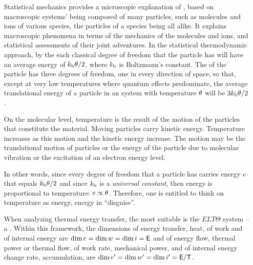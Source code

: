 \begin{note}
Statistical mechanics provides a microscopic explanation of , based on macroscopic systems' being composed of many particles, such as molecules and ions of various species, the particles of a species being all alike. It explains macroscopic phenomena in terms of the mechanics of the molecules and ions, and statistical assessments of their joint adventures. In the statistical thermodynamic approach, by the  each classical degree of freedom that the particle has will have an average energy of $k_\text{b}\theta/2$, where $k_\text{b}$ is Boltzmann's constant. The  of the particle has three degrees of freedom, one in every direction of space, so that, except at very low temperatures where quantum effects predominate, the average translational energy of a particle in an system with temperature $\theta$ will be $3k_\text{b}\theta/2$.

On the molecular level, temperature is the result of the motion of the particles that constitute the material. Moving particles carry kinetic energy. Temperature increases as this motion and the kinetic energy increase. The motion may be the translational motion of particles or the energy of the particle due to molecular vibration or the excitation of an electron energy level.

In other words, since every degree of freedom that a particle has carries energy $e$ that equals $k_\text{b}\theta/2$ and since $k_\text{b}$ is a \emph{universal constant}, then energy is proportional to temperature: $e\propto\theta$. Therefore, one is entitled to think on temperature as energy, energy in ``disguise''.
\end{note}

\begin{dimensional}
When analyzing thermal energy transfer, the most suitable  is the $ELT\Theta$ system -- a . Within this framework, the dimensions of energy transfer, \aka heat, of work and of internal energy are $\dim e = \dim w = \dim i = \mathsf{E}$ and of energy flow, \aka thermal power or thermal flow, of work rate, \aka mechanical power, and of internal energy change rate, \aka accumulation, are $\dim{e}^{\prime} = \dim{w}^{\prime} = \dim{i}^{\prime} = \mathsf{E}/\mathsf{T}$.
\end{dimensional}

